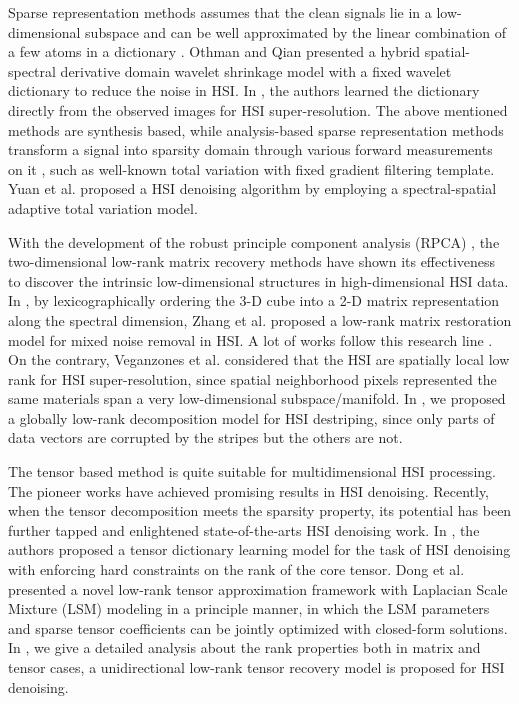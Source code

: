 \documentclass[twocolumn]{svjour3}          %
\begin{document}
  Sparse representation methods assumes that the clean signals lie in a low-dimensional subspace and can be well approximated by the linear combination of a few atoms in a dictionary \cite{elad2006image}. Othman and Qian \cite{othman2006noise} presented a hybrid spatial-spectral derivative domain wavelet shrinkage model with a fixed wavelet dictionary to reduce the noise in HSI. In \cite{dong2016hyperspectral, wei2015hyperspectral, akhtar2014sparse}, the authors learned the dictionary directly from the observed images for HSI super-resolution. The above mentioned methods are synthesis based, while analysis-based sparse representation methods transform a signal into sparsity domain through various forward measurements on it \cite{cai2012image}, such as well-known total variation \cite{rudin1992nonlinear} with fixed gradient filtering template. Yuan et al. \cite{yuan2012hyperspectral} proposed a HSI denoising algorithm by employing a spectral-spatial adaptive total variation model.

  With the development of the robust principle component analysis (RPCA) \cite{wright2009robust}, the two-dimensional low-rank matrix recovery methods have shown its effectiveness to discover the intrinsic low-dimensional structures in high-dimensional HSI data. In \cite{zhang2014hyperspectral}, by lexicographically ordering the 3-D cube into a 2-D matrix representation along the spectral dimension, Zhang et al. proposed a low-rank matrix restoration model for mixed noise removal in HSI. A lot of works follow this research line \cite{zhao2015hyperspectral, xie2016hyperspectral, he2016total}. On the contrary, Veganzones et al. \cite{veganzones2016hyperspectral} considered that the HSI are spatially local low rank for HSI super-resolution, since spatial neighborhood pixels represented the same materials span a very low-dimensional subspace/manifold. In \cite{chang2016remote}, we proposed a globally low-rank decomposition model for HSI destriping, since only parts of data vectors are corrupted by the stripes but the others are not.

  The tensor based method \cite{Lathauwer2000A} is quite suitable for multidimensional HSI processing. The pioneer works \cite{letexier2008noise, liu2012denoising, guo2013hyperspectral} have achieved promising results in HSI denoising. Recently, when the tensor decomposition meets the sparsity property, its potential has been further tapped and enlightened state-of-the-arts HSI denoising work. In \cite{peng2014decomposable}, the authors proposed a tensor dictionary learning model for the task of HSI denoising with enforcing hard constraints on the rank of the core tensor. Dong et al. \cite{dong2015low} presented a novel low-rank tensor approximation framework with Laplacian Scale Mixture (LSM) modeling in a principle manner, in which the LSM parameters and sparse tensor coefficients can be jointly optimized with closed-form solutions. In \cite{Chang2017Hyper}, we give a detailed analysis about the rank properties both in matrix and tensor cases, a unidirectional low-rank tensor recovery model is proposed for HSI denoising.
\end{document}
